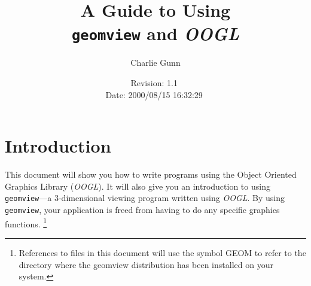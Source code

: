 %

%	
%

%
%
%
%
%
% 
% 



\newcommand{\progname}[1]{{\tt #1}}
\newcommand{\filename}[1]{{\tt #1}}
\newcommand{\modulename}[1]{{\tt #1}}
\newcommand{\OOGL}{{\em OOGL}}

\title{A Guide to Using \\
\progname{geomview} and {\OOGL}}

\date{ $ $Revision: 1.1 $ $ \\
$ $Date: 2000/08/15 16:32:29 $ $}


\author{Charlie Gunn}



\maketitle

\section{Introduction}

This document will show you how to write programs using the Object
Oriented Graphics Library ({\OOGL}).  It will also give you an introduction
to using \progname{geomview}---a 3-dimensional viewing program
written using {\OOGL}.  By using \progname{geomview}, your application
is freed from  having to do any specific graphics functions.
\footnote{References to files in this document will use the
symbol GEOM to refer to the directory where the geomview
distribution has been installed on your system.}


